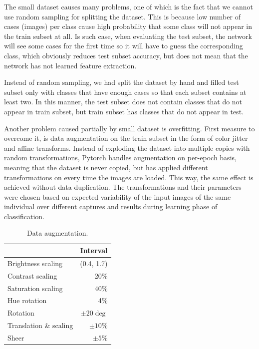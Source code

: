 \documentclass[fleqn,moreauthors,10pt]{ds_report}
\begin{document}
The small dataset causes many problems, one of which is the fact that we cannot use random sampling for splitting the dataset. This is because low number of cases (images) per class cause high probability that some class will not appear in the train subset at all. Is such case, when evaluating the test subset, the network will see some cases for the first time so it will have to guess the corresponding class, which obviously reduces test subset accuracy, but does not mean that the network has not learned feature extraction.

Instead of random sampling, we had split the dataset by hand and filled test subset only with classes that have enough cases so that each subset contains at least two. In this manner, the test subset does not contain classes that do not appear in train subset, but train subset has classes that do not appear in test.

Another problem caused partially by small dataset is overfitting. First measure to overcome it, is data augmentation on the train subset in the form of color jitter and affine transforms. Instead of exploding the dataset into multiple copies with random transformations, Pytorch handles augmentation on per-epoch basis, meaning that the dataset is never copied, but has applied different transformations on every time the images are loaded. This way, the same effect is achieved without data duplication. The transformations and their parameters were chosen based on expected variability of the input images of the same individual over different captures and results during learning phase of classification.

\begin{table}[h]
	\caption{Data augmentation.}
	\centering
	\begin{tabular}{l | r }
		\toprule
		                   & Interval     \\
		\midrule
		Brightness scaling & (0.4, 1.7)   \\
		Contrast scaling   & 20\%         \\
		Saturation scaling & 40\%         \\
		Hue rotation       & 4\%          \\
		Rotation           & $\pm20\deg$  \\
		Translation \& scaling       & $\pm10\%$    \\
		Sheer              & $\pm5\%$     \\
		\bottomrule
	\end{tabular}
	\label{tab:augmentation}
\end{table}
\end{document}
